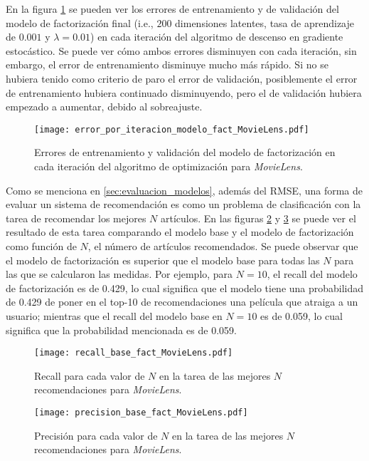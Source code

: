 En la figura \ref{fig:ML_modelo_fact_error_por_iter} se pueden ver los errores de entrenamiento y de validación del modelo de factorización final (i.e., $200$ dimensiones latentes, tasa de aprendizaje de $0.001$ y $\lambda = 0.01$) en cada iteración del algoritmo de descenso en gradiente estocástico. Se puede ver cómo ambos errores disminuyen con cada iteración, sin embargo, el error de entrenamiento disminuye mucho más rápido. Si no se hubiera tenido como criterio de paro el error de validación, posiblemente el error de entrenamiento hubiera continuado disminuyendo, pero el de validación hubiera empezado a aumentar, debido al sobreajuste.


\begin{figure}[H]
	\centering
 	\texttt{[image: error\_por\_iteracion\_modelo\_fact\_MovieLens.pdf]}
 	\caption{Errores de entrenamiento y validación del modelo de factorización en cada iteración del algoritmo de optimización para \textit{MovieLens}.}
 	\label{fig:ML_modelo_fact_error_por_iter}
\end{figure}

Como se menciona en \ref{sec:evaluacion_modelos}, además del RMSE, una forma de evaluar un sistema de recomendación es como un problema de clasificación con la tarea de recomendar los mejores $N$ artículos. En las figuras \ref{fig:ML_recall_top_N} y \ref{fig:ML_precision_top_N} se puede ver el resultado de esta tarea comparando el modelo base y el modelo de factorización como función de $N$, el número de artículos recomendados. Se puede observar que el modelo de factorización es superior que el modelo base para todas las $N$ para las que se calcularon las medidas. Por ejemplo, para $N = 10$, el recall del modelo de factorización es de 0.429, lo cual significa que el modelo tiene una probabilidad de 0.429 de poner en el top-10 de recomendaciones una película que atraiga a un usuario; mientras que el recall del modelo base en $N = 10$ es de 0.059, lo cual significa que la probabilidad mencionada es de 0.059.

\begin{figure}[H]
	\centering
 	\texttt{[image: recall\_base\_fact\_MovieLens.pdf]}
 	\caption{Recall para cada valor de $N$ en la tarea de las mejores $N$ recomendaciones para \textit{MovieLens}.}
 	\label{fig:ML_recall_top_N}
\end{figure}

\begin{figure}[H]
	\centering
 	\texttt{[image: precision\_base\_fact\_MovieLens.pdf]}
 	\caption{Precisión para cada valor de $N$ en la tarea de las mejores $N$ recomendaciones para \textit{MovieLens}.}
 	\label{fig:ML_precision_top_N}
\end{figure}

